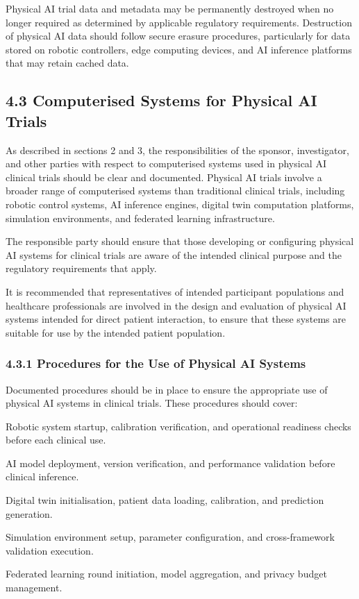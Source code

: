 \documentclass[11pt]{article}
\begin{document}
Physical AI trial data and metadata may be permanently destroyed when no longer required as determined by applicable regulatory requirements. Destruction of physical AI data should follow secure erasure procedures, particularly for data stored on robotic controllers, edge computing devices, and AI inference platforms that may retain cached data.

\subsection{4.3 Computerised Systems for Physical AI Trials}

As described in sections 2 and 3, the responsibilities of the sponsor, investigator, and other parties with respect to computerised systems used in physical AI clinical trials should be clear and documented. Physical AI trials involve a broader range of computerised systems than traditional clinical trials, including robotic control systems, AI inference engines, digital twin computation platforms, simulation environments, and federated learning infrastructure.

The responsible party should ensure that those developing or configuring physical AI systems for clinical trials are aware of the intended clinical purpose and the regulatory requirements that apply.

It is recommended that representatives of intended participant populations and healthcare professionals are involved in the design and evaluation of physical AI systems intended for direct patient interaction, to ensure that these systems are suitable for use by the intended patient population.

\subsubsection{4.3.1 Procedures for the Use of Physical AI Systems}

Documented procedures should be in place to ensure the appropriate use of physical AI systems in clinical trials. These procedures should cover:

\begin{description}[leftmargin=2.5cm,style=sameline]

\item[(a)] Robotic system startup, calibration verification, and operational readiness checks before each clinical use.

\item[(b)] AI model deployment, version verification, and performance validation before clinical inference.

\item[(c)] Digital twin initialisation, patient data loading, calibration, and prediction generation.

\item[(d)] Simulation environment setup, parameter configuration, and cross-framework validation execution.

\item[(e)] Federated learning round initiation, model aggregation, and privacy budget management.

\end{description}
\end{document}
